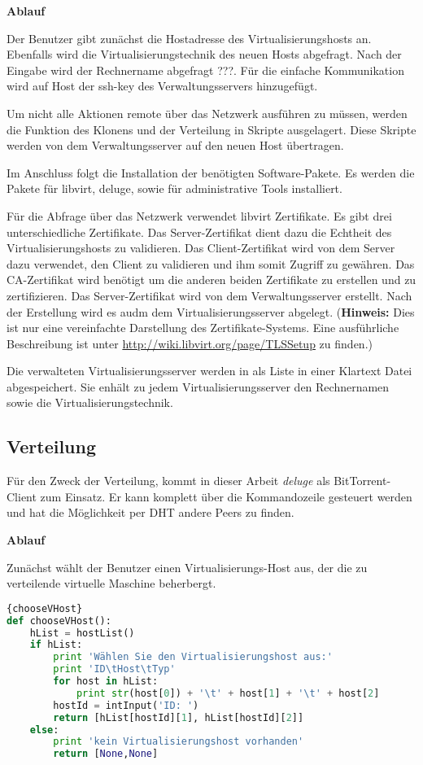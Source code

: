 \textbf{Ablauf}

Der Benutzer gibt zunächst die Hostadresse des Virtualisierungshosts an. Ebenfalls wird die Virtualisierungstechnik des neuen Hosts abgefragt. Nach der Eingabe wird der Rechnername abgefragt ???. Für die einfache Kommunikation wird auf Host der ssh-key des Verwaltungsservers hinzugefügt. 

Um nicht alle Aktionen remote über das Netzwerk ausführen zu müssen, werden die Funktion des Klonens und der Verteilung in Skripte ausgelagert. Diese Skripte werden von dem Verwaltungsserver auf den neuen Host übertragen.

Im Anschluss folgt die Installation der benötigten Software-Pakete. Es werden die Pakete für libvirt, deluge, sowie für administrative Tools installiert. 

Für die Abfrage über das Netzwerk verwendet libvirt Zertifikate. Es gibt drei unterschiedliche Zertifikate. Das Server-Zertifikat dient dazu die Echtheit des Virtualisierungshosts zu validieren. Das Client-Zertifikat wird von dem Server dazu verwendet, den Client zu validieren und ihm somit Zugriff zu gewähren. Das CA-Zertifikat wird benötigt um die anderen beiden Zertifikate zu erstellen und zu zertifizieren. Das Server-Zertifikat wird von dem Verwaltungsserver erstellt. Nach der Erstellung wird es audm dem Virtualisierungsserver abgelegt. (\textbf{Hinweis:} Dies ist nur eine vereinfachte Darstellung des Zertifikate-Systems. Eine ausführliche Beschreibung ist unter \href{http://wiki.libvirt.org/page/TLSSetup}{http://wiki.libvirt.org/page/TLSSetup} zu finden.) 

Die verwalteten Virtualisierungsserver werden in als Liste in einer Klartext Datei abgespeichert. Sie enhält zu jedem Virtualisierungsserver den Rechnernamen sowie die Virtualisierungstechnik. 

\subsection{Verteilung}
Für den Zweck der Verteilung, kommt in dieser Arbeit \textit{deluge} als BitTorrent-Client zum Einsatz. Er kann komplett über die Kommandozeile gesteuert werden und hat die Möglichkeit per DHT andere Peers zu finden.

\textbf{Ablauf}

Zunächst wählt der Benutzer einen Virtualisierungs-Host aus, der die zu verteilende virtuelle Maschine beherbergt. 
\\
\begin{lstlisting}[caption=VHost-Auswahl,language=Python,label=chooseVHost]{chooseVHost}
def chooseVHost():
	hList = hostList()
	if hList:
		print 'Wählen Sie den Virtualisierungshost aus:'
		print 'ID\tHost\tTyp'
		for host in hList:
			print str(host[0]) + '\t' + host[1] + '\t' + host[2]
		hostId = intInput('ID: ')
		return [hList[hostId][1], hList[hostId][2]]
	else:
		print 'kein Virtualisierungshost vorhanden'
		return [None,None]
\end{lstlisting}

